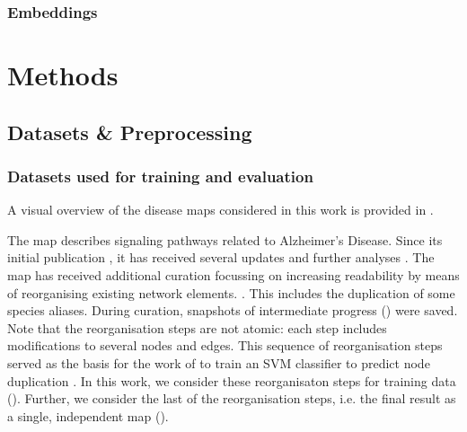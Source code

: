 \documentclass[
	fontsize=10pt, %
	twoside=false, %
	secnumdepth=1, %
]{kaobook}
\begin{document}
\subsection{Embeddings}









\chapter{Methods}
\label{sec:methods}


\section{Datasets \& Preprocessing}
\label{sec:datasets}

\subsection{Datasets used for training and evaluation}

A visual overview of the disease maps considered in this work is provided in
.

The  map describes signaling pathways related to
Alzheimer's Disease. Since its initial publication
\cite{mizuno_AlzPathwayComprehensiveMap_2012}, it has received several
updates and further analyses 
\cite{ogishima_MapAlzheimerDiseasesignaling_2013}
\cite{ogishima_AlzPathwayUpdatedMap_2016}
\cite{mizuno_NetworkAnalysisComprehensive_2016}.
%
The map has received additional curation focussing on increasing readability by
means of reorganising existing network elements.
\cite{ostaszewski_AlzPathwayRegorganisationSteps_2021}.
This includes the duplication
of some species aliases. During curation, snapshots of intermediate progress
() were saved. Note that the reorganisation steps are
not atomic: each step includes modifications to several nodes and edges.
This sequence of reorganisation steps served as the basis for the
work of \citeauthor{nielsen_MachineLearningSupport_2019} to train an SVM
classifier to predict node duplication
\cite{nielsen_MachineLearningSupport_2019}. In this work, we consider these
reorganisaton steps for training data (). Further, we consider
the last of the reorganisation steps, i.e. the final result as a single,
independent map ().
\end{document}
